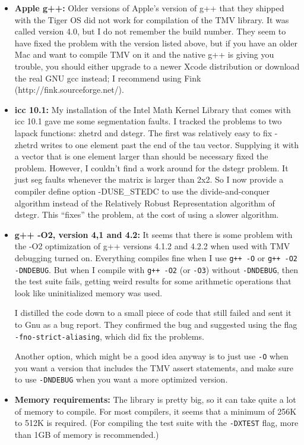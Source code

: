 \documentclass[twoside,letterpaper,11pt]{article}
\renewcommand{\tt}[1]{{\texttt {#1}}}
\begin{document}
\begin{itemize}
\item {\bf Apple g++:}
Older versions of Apple's version of g++ that they shipped with the Tiger OS did not work for 
compilation of the TMV library.  It was called version 4.0, but I do not remember the build number.
They seem to have fixed the problem with the version
listed above,
but if you have an older Mac and want to compile TMV on it and the native g++ 
is giving you trouble,
you should either upgrade to a newer Xcode distribution or download the real GNU gcc instead;  
I recommend using Fink (http://fink.sourceforge.net/).

\item {\bf icc 10.1:}
My installation of the Intel Math Kernel Library that comes with icc 10.1
gave me some segmentation faults.  I tracked the problems to two lapack
functions: zhetrd and dstegr.  The first was relatively easy to fix - 
zhetrd writes to one element past the end of the tau vector.  Supplying
it with a vector that is one element larger than should be necessary 
fixed the problem.  However, I couldn't find a work around for the dstegr
problem.  It just seg faults whenever the matrix is larger than 2x2.
So I now provide a compiler define option -DUSE\_STEDC to use the 
divide-and-conquer algorithm instead of the Relatively Robust Representation
algorithm of dstegr.  This ``fixes'' the problem, at the cost of using a slower
algorithm.

\item {\bf g++ -O2, version 4,1 and 4.2:}
It seems that there is some problem with the -O2 optimization of g++ versions 4.1.2 and 4.2.2
when used with TMV debugging turned on.  Everything compiles fine when I use
\tt{g++ -O} or \tt{g++ -O2 -DNDEBUG}.  But when I compile with \tt{g++ -O2} (or \tt{-O3}) without
\tt{-DNDEBUG}, then the test suite fails, getting weird results for some arithmetic operations
that look like uninitialized memory was used.  

I distilled the code down to a small piece of code that still failed 
and sent it to Gnu as a bug report.
They confirmed the bug and suggested
using the flag \tt{-fno-strict-aliasing}, which did fix the problems.

Another option, which might be a good idea anyway is to just use \tt{-O} 
when you want a version that 
includes the TMV assert statements, and make sure to use \tt{-DNDEBUG} 
when you want a more optimized version.

\item {\bf Memory requirements:}
The library is pretty big, so it can take quite a lot of memory to compile. 
For most compilers, it seems that a minimum of 256K to 512K is required.
(For compiling the test suite with the \tt{-DXTEST} flag, more than 
1GB of memory is recommended.)


\end{itemize}
\end{document}

